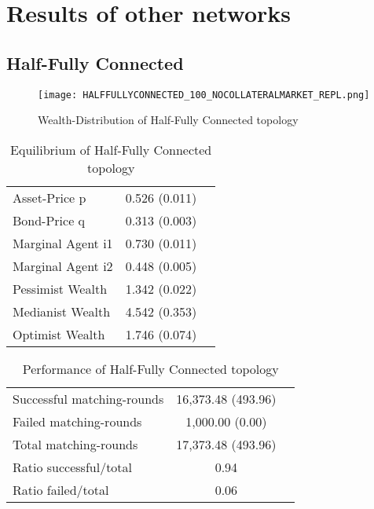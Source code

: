 \documentclass[Bachelorarbeit.tex]{subfiles}
\begin{document}
\graphicspath{{./figures/appendixResults/}}	%

\chapter{Results of other networks}
\label{app:results}

\section{Half-Fully Connected}
\begin{figure}[H]
	\centering
  \texttt{[image: HALFFULLYCONNECTED\_100\_NOCOLLATERALMARKET\_REPL.png]}
	\caption{Wealth-Distribution of Half-Fully Connected topology }
	\label{fig:wealth_HALFFULLYCONNECTED_100_NOCOLLATERALMARKET_REPL}
\end{figure}

\begin{table}[H]
	\caption{Equilibrium of Half-Fully Connected topology}
	\centering
	\begin{tabular} { l c r }
		\hline
		Asset-Price p & 0.526 (0.011) \\
		Bond-Price q & 0.313 (0.003) \\
		Marginal Agent i1 & 0.730 (0.011) \\
		Marginal Agent i2 & 0.448 (0.005) \\
		\hline
		Pessimist Wealth & 1.342 (0.022) \\
		Medianist Wealth & 4.542 (0.353) \\
		Optimist Wealth & 1.746 (0.074) \\
		\hline
	\end{tabular}
\end{table} 

\begin{table}[H]
	\caption{Performance of Half-Fully Connected topology}
	\centering
	\begin{tabular} { l c r }
		\hline
		Successful matching-rounds & 16,373.48 (493.96) \\
		Failed matching-rounds & 1,000.00 (0.00) \\
		Total matching-rounds & 17,373.48 (493.96) \\
		\hline
		Ratio successful/total & 0.94 \\
		Ratio failed/total & 0.06 \\
		\hline
	\end{tabular}
\end{table}
\end{document}
